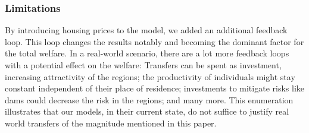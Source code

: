 \documentclass[10pt,a4paper]{article}
\begin{document}
\subsubsection{Limitations}
By introducing housing prices to the model, we added an additional feedback loop. This loop changes the results notably and becoming the dominant factor for the total welfare. In a real-world scenario, there are a lot more feedback loops with a potential effect on the welfare: Transfers can be spent as investment, increasing attractivity of the regions; the productivity of individuals might stay constant independent of their place of residence; investments to mitigate risks like dams could decrease the risk in the regions; and many more. This enumeration illustrates that our models, in their current state, do not suffice to justify real world transfers of the magnitude mentioned in this paper.
\newpage
\end{document}
